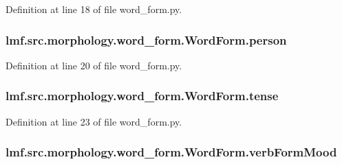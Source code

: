 Definition at line 18 of file word\+\_\+form.\+py.

\hypertarget{classlmf_1_1src_1_1morphology_1_1word__form_1_1_word_form_a982fc33af45a08aa5a039dc4701c3689}{
\subsubsection[{person}]{\setlength{\rightskip}{0pt plus 5cm}lmf.\+src.\+morphology.\+word\+\_\+form.\+Word\+Form.\+person}}\label{classlmf_1_1src_1_1morphology_1_1word__form_1_1_word_form_a982fc33af45a08aa5a039dc4701c3689}


Definition at line 20 of file word\+\_\+form.\+py.

\hypertarget{classlmf_1_1src_1_1morphology_1_1word__form_1_1_word_form_aaf6dd6658e2e9014ea0490d0edb6cec8}{
\subsubsection[{tense}]{\setlength{\rightskip}{0pt plus 5cm}lmf.\+src.\+morphology.\+word\+\_\+form.\+Word\+Form.\+tense}}\label{classlmf_1_1src_1_1morphology_1_1word__form_1_1_word_form_aaf6dd6658e2e9014ea0490d0edb6cec8}


Definition at line 23 of file word\+\_\+form.\+py.

\hypertarget{classlmf_1_1src_1_1morphology_1_1word__form_1_1_word_form_a47aea97a4bbd8cca9624b0143f639716}{
\subsubsection[{verb\+Form\+Mood}]{\setlength{\rightskip}{0pt plus 5cm}lmf.\+src.\+morphology.\+word\+\_\+form.\+Word\+Form.\+verb\+Form\+Mood}}\label{classlmf_1_1src_1_1morphology_1_1word__form_1_1_word_form_a47aea97a4bbd8cca9624b0143f639716}


